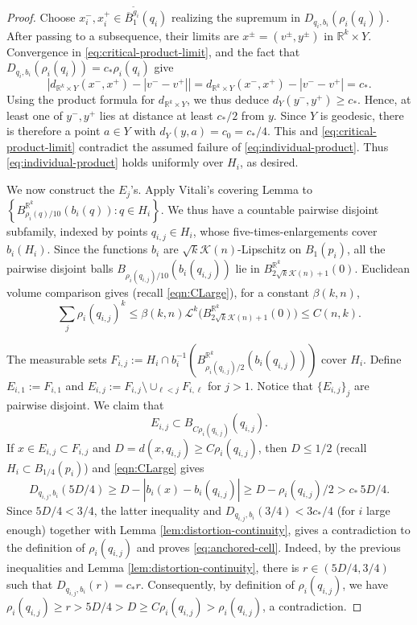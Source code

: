 \documentclass[11pt]{amsart}
\theoremstyle{definition}
\theoremstyle{remark}
\begin{document}
\begin{proof}
Choose $x_i^-,x_i^+\in\overline B_1^{\widetilde g_i}(q_i)$ realizing
the supremum in $D_{q_i,b_i}(\rho_i(q_i))$.  After passing to a subsequence, their
limits are $x^\pm=(v^\pm,y^\pm)$ in
$\mathbb R^k\times Y$.  Convergence in
\eqref{eq:critical-product-limit}, and the fact that $D_{q_i,b_i}(\rho_i(q_i))=c_*\rho_i(q_i)$ give
\[
 \left|
 d_{\mathbb R^k\times Y}(x^-,x^+)-|v^--v^+|
 \right|=d_{\mathbb R^k\times Y}(x^-,x^+)-|v^--v^+|=c_*.
\]
Using the product formula for $d_{\mathbb R^k\times Y}$, we thus deduce $d_Y(y^-,y^+)\geq c_*$. Hence, at least one of $y^-,y^+$ lies at distance at least $c_*/2$ from
$y$.  Since $Y$ is geodesic, there is therefore a point $a\in Y$ with
$d_Y(y,a)=c_0=c_*/4$.  This and
\eqref{eq:critical-product-limit} contradict the assumed failure of
\eqref{eq:individual-product}.  Thus \eqref{eq:individual-product}
holds uniformly over $H_i$, as desired.

We now construct the $E_j$'s.  Apply Vitali's covering Lemma to $
 \left\{B_{\rho_i(q)/10}^{\mathbb R^k}(b_i(q)):q\in H_i\right\}$. 
We thus have a countable pairwise disjoint subfamily,
indexed by points $q_{i,j}\in H_i$, whose  five-times-enlargements cover
$b_i(H_i)$. Since the functions $b_i$ are $\sqrt{k}\mathcal{K}(n)$-Lipschitz on $B_1(p_i)$, all the pairwise disjoint
balls $B_{\rho_i(q_{i,j})/10}(b_i(q_{i,j}))$ lie in
$B_{2\sqrt{k}\mathcal{K}(n)+1}^{\mathbb R^k}(0)$.  Euclidean volume comparison gives (recall \eqref{eqn:CLarge}), for a constant $\beta(k,n)$,
\begin{equation}\label{eq:sum-variable-scales}
 \sum_j\rho_i(q_{i,j})^k
 \leq \beta(k,n) \mathcal L^k\bigl(B_{2\sqrt{k}\mathcal{K}(n)+1}^{\mathbb R^k}(0)\bigr)\leq C(n,k).
\end{equation}

The measurable sets $
 F_{i,j}:=H_i\cap b_i^{-1}
 \left(B_{\rho_i(q_{i,j})/2}^{\mathbb R^k}(b_i(q_{i,j}))\right)$
cover $H_i$.  Define $E_{i,1}:=F_{i,1}$ and $E_{i,j}:=F_{i,j}\setminus \cup_{\ell<j}F_{i,\ell}$ for $j>1$. Notice that $\{E_{i,j}\}_j$ are pairwise disjoint. We claim that
\begin{equation}\label{eq:anchored-cell}
                              E_{i,j}\subset B_{C\rho_i(q_{i,j})}(q_{i,j}).
\end{equation}
If $x\in E_{i,j}\subset F_{i,j}$ and $D=d(x,q_{i,j})\geq C\rho_i(q_{i,j})$, then $D\leq1/2$ (recall $H_i\subset B_{1/4}(p_i)$) and
\eqref{eqn:CLarge} gives
\[
 D_{q_{i,j},b_i}(5D/4)
 \geq D-|b_i(x)-b_i(q_{i,j})|
 \geq D-\rho_i(q_{i,j})/2
 >c_*\,5D/4.
\]
Since $5D/4<3/4$, the latter inequality and
$D_{q_{i,j},b_i}(3/4)<3c_*/4$ (for $i$ large enough) together with
Lemma \ref{lem:distortion-continuity}, gives a 
contradiction to the definition of $\rho_i(q_{i,j})$ and proves
\eqref{eq:anchored-cell}. Indeed, by the previous inequalities and Lemma \ref{lem:distortion-continuity}, there is $r\in (5D/4,3/4)$ such that $D_{q_{i,j},b_i}(r)=c_*r$. Consequently, by definition of $\rho_{i}(q_{i,j})$, we have $\rho_i(q_{i,j})\geq r>5D/4>D\geq C\rho_{i}(q_{i,j})>\rho_{i}(q_{i,j})$, a contradiction.


\end{proof}
\end{document}
